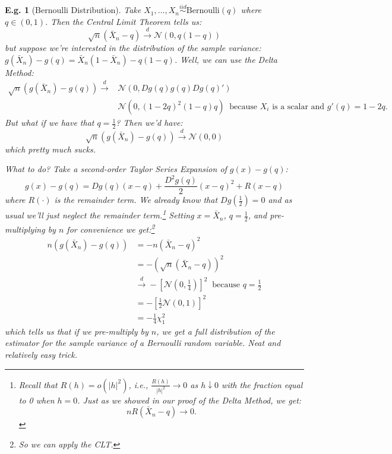 \documentclass{tufte-book}
\theoremstyle{mytheoremstyle}
\theoremstyle{mylemstyle}
\theoremstyle{mydefstyle}
\newtheorem*{ex}{E.g.}
\begin{document}
\begin{ex}[Bernoulli Distribution] Take \(X_1, \dots, X_n \overset{iid}{\sim} \text{Bernoulli}(q)\) where \(q \in (0, 1)\). Then the Central Limit Theorem tells us:
	\[\sqrt{n}(\bar{X}_n - q) \overset{d}{\rightarrow} \mathcal{N}(0, q(1-q)) \]
but suppose we're interested in the distribution of the sample variance: \(g(\bar{X}_n) - g(q) = \bar{X}_n(1-\bar{X}_n) - q(1-q)\). Well, we can use the Delta Method:
	\begin{align*}
		\sqrt{n}(g(\bar{X}_n) - g(q)) \overset{d}{\rightarrow} & \mathcal{N}(0, Dg(q)g(q)Dg(q)') \\
													& \mathcal{N}(0, (1-2q)^2 (1-q)q)\ \text{ because \(X_i\) is a scalar and \(g'(q) = 1 - 2q\).}
	\end{align*}
But what if we have that \(q = \frac{1}{2}\)? Then we'd have: 
	\[\sqrt{n}(g(\bar{X}_n) - g(q)) \overset{d}{\rightarrow} \mathcal{N}(0, 0)\] 
which pretty much sucks.

What to do? Take a second-order Taylor Series Expansion of \(g(x) - g(q)\):
	\[g(x) - g(q) = Dg(q)(x-q) + \frac{D^2g(q)}{2}(x-q)^2 + R(x-q)\]
where \(R(\cdot)\) is the remainder term. We already know that \(Dg(\frac{1}{2}) = 0\) and as usual we'll just neglect the remainder term.\footnote{Recall that \(R(h) = o(|h|^2)\), i.e., \(\frac{R(h)}{|h|^2} \rightarrow 0\) as \(h \downarrow 0\) with the fraction equal to 0 when \(h = 0\). Just as we showed in our proof of the Delta Method, we get:
	\[nR(\bar{X}_n - q) \rightarrow 0 \text{.}\]	} 
Setting \(x = \bar{X}_n\), \(q = \frac{1}{2}\), and pre-multiplying by \(n\) for convenience we get:\footnote{So we can apply the CLT.}
	\begin{align*}
		n(g(\bar{X}_n) - g(q)) & = -n \left(\bar{X}_n - q\right)^2 \\
							& = - \left(\sqrt{n}(\bar{X}_n - q)\right)^2 \\
							& \overset{d}{\rightarrow} -\left[\mathcal{N}(0, \frac{1}{4})\right]^2\ \text{ because \(q = \frac{1}{2}\)} \\
							& = -\left[\frac{1}{2} \mathcal{N}(0, 1)\right]^2 \\
							& = -\frac{1}{4} \chi_1^2 
	\end{align*}
which tells us that if we pre-multiply by \(n\), we get a full distribution of the estimator for the sample variance of a Bernoulli random variable. Neat and relatively easy trick. 	
\end{ex}
\end{document}
